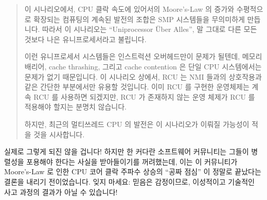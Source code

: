 \begin{quote}
	이 시나리오에서, CPU 클락 속도에 있어서의 Moore's-Law 의 증가와
	수평적으로 확장되는 컴퓨팅의 계속된 발전의 조합은 SMP 시스템들을
	무의미하게 만듭니다.
	따라서 이 시나리오는 ``Uniprocessor \"Uber Alles'', 말 그대로 다른
	모든것보다 나은 유니프로세서라고 불립니다.

	이런 유니프로세서 시스템들은 인스트럭션 오버헤드만이 문제가 될텐데,
	메모리 배리어, cache thrashing, 그리고 cache contention 은 단일 CPU
	시스템에서는 문제가 없기 때문입니다.
	이 시나리오 상에서, RCU 는 NMI 들과의 상호작용과 같은 간단한 부분에서만
	유용할 것입니다.
	이미 RCU 를 구현한 운영체제는 계속 RCU 를 사용하면 되겠지만, RCU 가
	존재하지 않는 운영 체제가 RCU 를 적용해야 할지는 분명치 않습니다.

	하지만, 최근의 멀티쓰레드 CPU 의 발전은 이 시나리오가 이뤄질 가능성이
	적을 것을 시사합니다.

\end{quote}

실제로 그렇게 되진 않을 겁니다!
하지만 한 커다란 소프트웨어 커뮤니티는 그들이 병렬성을 포용해야 한다는 사실을
받아들이기를 꺼려했는데, 이는 이 커뮤니티가 Moore's-Law 로 인한 CPU 코어 클락
주파수 상승의 ``공짜 점심'' 이 정말로 끝났다는 결론을 내리기 전이었습니다.
잊지 마세요: 믿음은 감정이므로, 이성적이고 기술적인 사고 과정의 결과가 아닐 수
있습니다!

